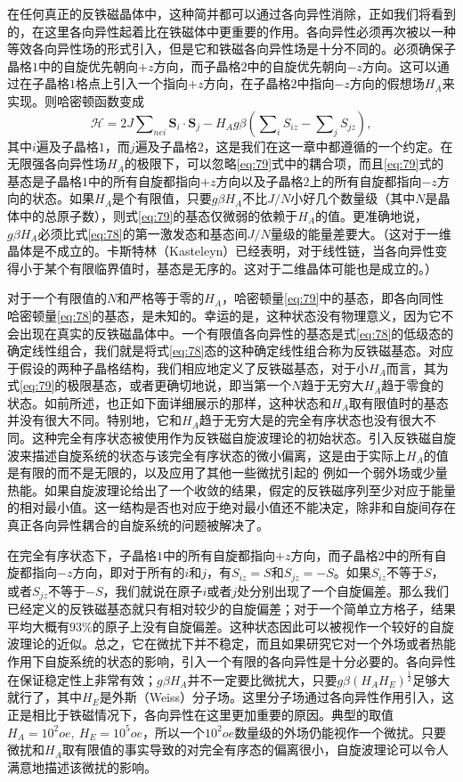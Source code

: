 \documentclass{article}
\begin{document}
在任何真正的反铁磁晶体中，这种简并都可以通过各向异性消除，正如我们将看到的，在这里各向异性起着比在铁磁体中更重要的作用。各向异性必须再次被以一种等效各向异性场的形式引入，但是它和铁磁各向异性场是十分不同的。必须确保子晶格$1$中的自旋优先朝向$+z$方向，而子晶格$2$中的自旋优先朝向$-z$方向。这可以通过在子晶格$1$格点上引入一个指向$+z$方向，在子晶格$2$中指向$-z$方向的假想场$H_A$来实现。则哈密顿函数变成
\begin{equation} \label{eq:79}
\mathcal{H}=2J\sum\nolimits_{\mathit{nei}}\mathbf{S}_i\cdot\mathbf{S}_j-H_Ag\beta(\sum\nolimits_iS_{iz}-\sum\nolimits_jS_{jz}),
\end{equation}
其中$i$遍及子晶格$1$，而$j$遍及子晶格$2$，这是我们在这一章中都遵循的一个约定。在无限强各向异性场$H_A$的极限下，可以忽略\eqref{eq:79}式中的耦合项，而且\eqref{eq:79}式的基态是子晶格$1$中的所有自旋都指向$+z$方向以及子晶格$2$上的所有自旋都指向$-z$方向的状态。如果$H_A$是个有限值，只要$g\beta H_A$不比$J/N$小好几个数量级（其中$N$是晶体中的总原子数），则式\eqref{eq:79}的基态仅微弱的依赖于$H_A$的值。更准确地说，$g\beta H_A$必须比式\eqref{eq:78}的第一激发态和基态间$J/N$量级的能量差要大。（这对于一维晶体是不成立的。卡斯特林（Kasteleyn）已经表明，对于线性链，当各向异性变得小于某个有限临界值时，基态是无序的。这对于二维晶体可能也是成立的。）

对于一个有限值的$N$和严格等于零的$H_A$，哈密顿量\eqref{eq:79}中的基态，即各向同性哈密顿量\eqref{eq:78}的基态，是未知的。幸运的是，这种状态没有物理意义，因为它不会出现在真实的反铁磁晶体中。一个有限值各向异性的基态是式\eqref{eq:78}的低级态的确定线性组合，我们就是将式\eqref{eq:78}态的这种确定线性组合称为反铁磁基态。对应于假设的两种子晶格结构，我们相应地定义了反铁磁基态，对于小$H_A$而言，其为式\eqref{eq:79}的极限基态，或者更确切地说，即当第一个$N$趋于无穷大$H_A$趋于零食的状态。如前所述，也正如下面详细展示的那样，这种状态和$H_A$取有限值时的基态并没有很大不同。特别地，它和$H_A$趋于无穷大是的完全有序状态也没有很大不同。这种完全有序状态被使用作为反铁磁自旋波理论的初始状态。引入反铁磁自旋波来描述自旋系统的状态与该完全有序状态的微小偏离，这是由于实际上$H_A$的值是有限的而不是无限的，以及应用了其他一些微扰引起的 例如一个弱外场或少量热能。如果自旋波理论给出了一个收敛的结果，假定的反铁磁序列至少对应于能量的相对最小值。这一结构是否也对应于绝对最小值还不能决定，除非和自旋间存在真正各向异性耦合的自旋系统的问题被解决了。

在完全有序状态下，子晶格$1$中的所有自旋都指向$+z$方向，而子晶格$2$中的所有自旋都指向$-z$方向，即对于所有的$i$和$j$，有$S_{iz}=S$和$S_{jz}=-S$。如果$S_{iz}$不等于$S$，或者$S_{jz}$不等于$-S$，我们就说在原子$i$或者$j$处分别出现了一个自旋偏差。那么我们已经定义的反铁磁基态就只有相对较少的自旋偏差；对于一个简单立方格子，结果平均大概有$93\%$的原子上没有自旋偏差。这种状态因此可以被视作一个较好的自旋波理论的近似。总之，它在微扰下并不稳定，而且如果研究它对一个外场或者热能作用下自旋系统的状态的影响，引入一个有限的各向异性是十分必要的。各向异性在保证稳定性上非常有效；$g\beta H_A$并不一定要比微扰大，只要$g\beta(H_A H_E)^\frac{1}{2}$足够大就行了，其中$H_E$是外斯（Weiss）分子场。这里分子场通过各向异性作用引入，这正是相比于铁磁情况下，各向异性在这里更加重要的原因。典型的取值$H_A=10^2oe,~H_E=10^5oe$，所以一个$10^2oe$数量级的外场仍能视作一个微扰。只要微扰和$H_A$取有限值的事实导致的对完全有序态的偏离很小，自旋波理论可以令人满意地描述该微扰的影响。
\end{document}
